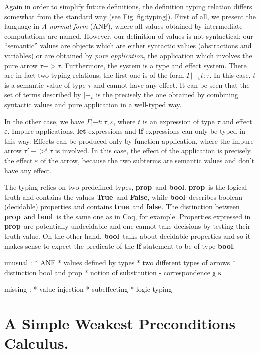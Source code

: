 \documentclass[a4paper]{llncs}
\newcommand{\letml}{{\bf let}}
\newcommand{\ifml}{{\bf if}}
\newcommand{\propml}{{\bf prop}}
\newcommand{\boolml}{{\bf bool}}
\newcommand{\Trueml}{{\bf True}}
\newcommand{\Falseml}{{\bf False}}
\newcommand{\trueml}{{\bf true}}
\newcommand{\falseml}{{\bf false}}
\newcommand{\coq}{Coq}
\begin{document}
Again in order to simplify future definitions, the definition typing relation
differs somewhat from the standard way (see Fig.\ref{fig:typing}). First of
all, we present the language in {\em A-normal form} (ANF), where all values
obtained by intermediate computations are named. However, our definition of
values is not syntactical: our ``semantic'' values are objects which are
either syntactic values (abstractions and variables) or are obtained by {\em
pure application}, the application which involves the pure arrow $τ->τ$.
Furthermore, the system is a type and effect system. There are in fact two
typing relations, the first one is of the form $Γ|-_v  t : τ$. In this case,
$t$ is a semantic value of type $τ$ and cannot have any effect. It can be seen
that the set of terms described by $|-_v$ is the precisely the one obtained by
combining syntactic values and pure application in a well-typed way.

In the other case, we have $Γ|- t : τ, ε$, where $t$ is an expression of
type $τ$ and effect $ε$. Impure applications, \letml-expressions and
\ifml-expressions can only be typed in this way. Effects can be produced only
by function application, where the impure arrow $τ'->^ετ$ is involved. In this
case, the effect of the application is precisely the effect $ε$ of the arrow,
because the two subterms are semantic values and don't have any effect.

The typing relies on two predefined types, \propml\ and \boolml. \propml\ is
the logical truth and contains the values \Trueml\ and \Falseml, while
\boolml\ describes boolean (decidable) properties and contains \trueml\ and
\falseml. The distinction between \propml\ and \boolml\ is the same one as in
\coq, for example. Properties expressed in \propml\ are potentially
undecidable and one cannot take decisions by testing their truth value. On the
other hand, \boolml\ talks about decidable properties and so it makes sense to
expect the predicate of the \ifml-statement to be of type \boolml.


unusual : 
* ANF 
* values defined by types
* two different types of arrows
* distinction bool and prop
* notion of substitution - correspondence χ κ

missing : 
* value injection
* subeffecting
* logic typing


\section{A Simple Weakest Preconditions Calculus.}
\end{document}
